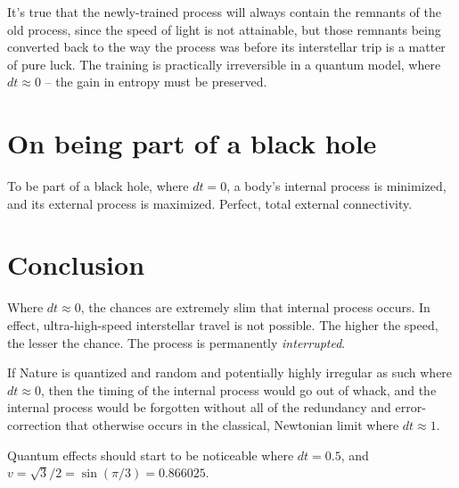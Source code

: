 \documentclass[12pt]{article}
\begin{document}
It's true that the newly-trained process will always contain the remnants of the old process, since the speed of light is not attainable, but those remnants being converted back to the way the process was before its interstellar trip is a matter of pure luck.
The training is practically irreversible in a quantum model, where $dt \approx 0$ -- the gain in entropy must be preserved.






\section{On being part of a black hole}
To be part of a black hole, where $dt = 0$, a body's internal process is minimized, and its external process is maximized.
Perfect, total external connectivity.




\section{Conclusion}
Where $dt \approx 0$, the chances are extremely slim that internal process occurs.
In effect, ultra-high-speed interstellar travel is not possible.
The higher the speed, the lesser the chance.
The process is permanently \textit{interrupted}.

If Nature is quantized and random and potentially highly irregular as such where $dt \approx 0$, then the timing of the internal process would go out of whack, and the internal process would be forgotten without all of the redundancy and error-correction that otherwise occurs in the classical, Newtonian limit where $dt \approx 1$.

Quantum effects should start to be noticeable where $dt = 0.5$, and $v = \sqrt{3} / 2 = \sin(\pi/3) = 0.866025$.
\end{document}
